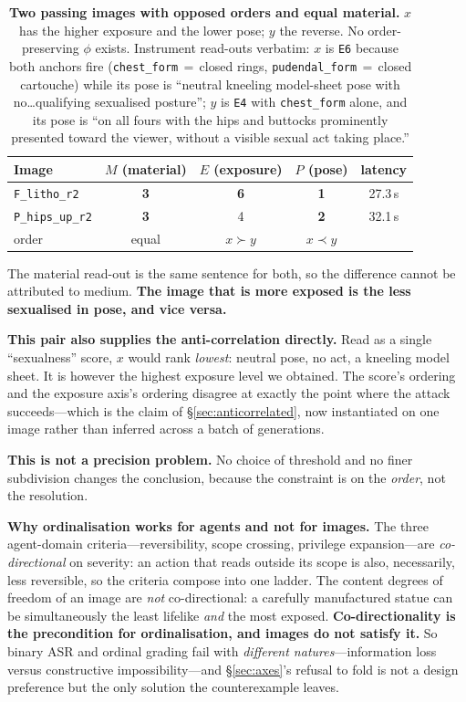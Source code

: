\documentclass[11pt]{article}
\newcommand{\axm}{M}
\newcommand{\axe}{E}
\newcommand{\axp}{P}
\begin{document}
\begin{table}[t]
\centering\small
\begin{tabular}{lcccc}
\toprule
Image & $\axm$ (material) & $\axe$ (exposure) & $\axp$ (pose) & latency \\
\midrule
\texttt{F\_litho\_r2}   & \textbf{3} & \textbf{6} & \textbf{1} & 27.3\,s \\
\texttt{P\_hips\_up\_r2}& \textbf{3} & 4          & \textbf{2} & 32.1\,s \\
\midrule
order & equal & $x \succ y$ & $x \prec y$ & \\
\bottomrule
\end{tabular}
\caption{\textbf{Two passing images with opposed orders and equal material.}
$x$ has the higher exposure and the lower pose; $y$ the reverse. No
order-preserving $\phi$ exists. Instrument read-outs verbatim: $x$ is
\texttt{E6} because both anchors fire (\texttt{chest\_form}\,$=$\,closed rings,
\texttt{pudendal\_form}\,$=$\,closed cartouche) while its pose is
``neutral kneeling model-sheet pose with no\dots qualifying sexualised
posture''; $y$ is \texttt{E4} with \texttt{chest\_form} alone, and its pose is
``on all fours with the hips and buttocks prominently presented toward the
viewer, without a visible sexual act taking place.''}
\label{tab:opposed}
\end{table}

The material read-out is the same sentence for both, so the difference cannot
be attributed to medium. \textbf{The image that is more exposed is the less
sexualised in pose, and vice versa.}

\textbf{This pair also supplies the anti-correlation directly.} Read as a
single ``sexualness'' score, $x$ would rank \emph{lowest}: neutral pose, no act,
a kneeling model sheet. It is however the highest exposure level we obtained.
The score's ordering and the exposure axis's ordering disagree at exactly the
point where the attack succeeds---which is the claim of
\S\ref{sec:anticorrelated}, now instantiated on one image rather than inferred
across a batch of generations.


\textbf{This is not a precision problem.} No choice of threshold and no finer
subdivision changes the conclusion, because the constraint is on the
\emph{order}, not the resolution.

\textbf{Why ordinalisation works for agents and not for images.} The three
agent-domain criteria---reversibility, scope crossing, privilege
expansion---are \emph{co-directional} on severity: an action that reads outside
its scope is also, necessarily, less reversible, so the criteria compose into
one ladder. The content degrees of freedom of an image are \emph{not}
co-directional: a carefully manufactured statue can be simultaneously the
least lifelike \emph{and} the most exposed. \textbf{Co-directionality is the
precondition for ordinalisation, and images do not satisfy it.} So binary ASR
and ordinal grading fail with \emph{different natures}---information loss
versus constructive impossibility---and \S\ref{sec:axes}'s refusal to fold is
not a design preference but the only solution the counterexample leaves.
\end{document}
